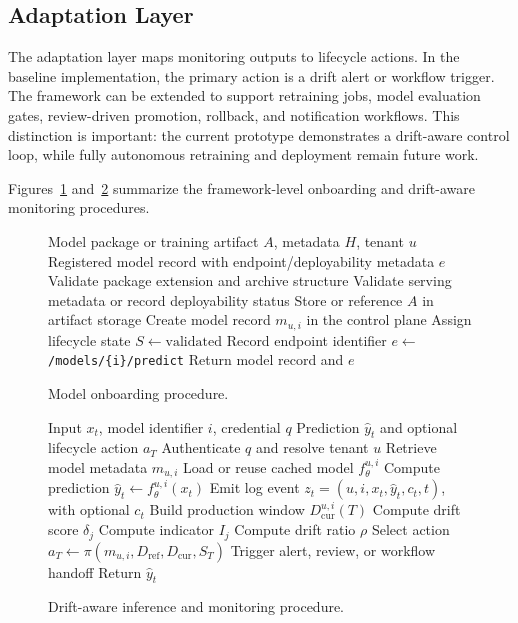 \documentclass[runningheads]{llncs}
\begin{document}
\subsection{Adaptation Layer}

The adaptation layer maps monitoring outputs to lifecycle actions. In the baseline implementation, the primary action is a drift alert or workflow trigger. The framework can be extended to support retraining jobs, model evaluation gates, review-driven promotion, rollback, and notification workflows. This distinction is important: the current prototype demonstrates a drift-aware control loop, while fully autonomous retraining and deployment remain future work.

Figures~\ref{alg:onboarding} and~\ref{alg:monitoring} summarize the framework-level onboarding and drift-aware monitoring procedures.

\begin{figure}[t]
\small
\begin{algorithmic}[1]
\REQUIRE Model package or training artifact $A$, metadata $H$, tenant $u$
\ENSURE Registered model record with endpoint/deployability metadata $e$
\STATE Validate package extension and archive structure
\STATE Validate serving metadata or record deployability status
\STATE Store or reference $A$ in artifact storage
\STATE Create model record $m_{u,i}$ in the control plane
\STATE Assign lifecycle state $S \leftarrow \mathrm{validated}$
\STATE Record endpoint identifier $e \leftarrow$ \texttt{/models/\{i\}/predict}
\STATE Return model record and $e$
\end{algorithmic}
\caption{Model onboarding procedure.}
\label{alg:onboarding}
\end{figure}

\begin{figure}[t]
\small
\begin{algorithmic}[1]
\REQUIRE Input $x_t$, model identifier $i$, credential $q$
\ENSURE Prediction $\hat{y}_t$ and optional lifecycle action $a_T$
\STATE Authenticate $q$ and resolve tenant $u$
\STATE Retrieve model metadata $m_{u,i}$
\STATE Load or reuse cached model $f_{\theta}^{u,i}$
\STATE Compute prediction $\hat{y}_t \leftarrow f_{\theta}^{u,i}(x_t)$
\STATE Emit log event $z_t=(u,i,x_t,\hat{y}_t,c_t,t)$, with optional $c_t$
    \STATE Build production window $D_{\mathrm{cur}}^{u,i}(T)$
        \STATE Compute drift score $\delta_j$
        \STATE Compute indicator $I_j$
    \ENDFOR
    \STATE Compute drift ratio $\rho$
    \STATE Select action $a_T \leftarrow \pi(m_{u,i},D_{\mathrm{ref}},D_{\mathrm{cur}},S_T)$
        \STATE Trigger alert, review, or workflow handoff
    \ENDIF
\ENDIF
\STATE Return $\hat{y}_t$
\end{algorithmic}
\caption{Drift-aware inference and monitoring procedure.}
\label{alg:monitoring}
\end{figure}
\end{document}

